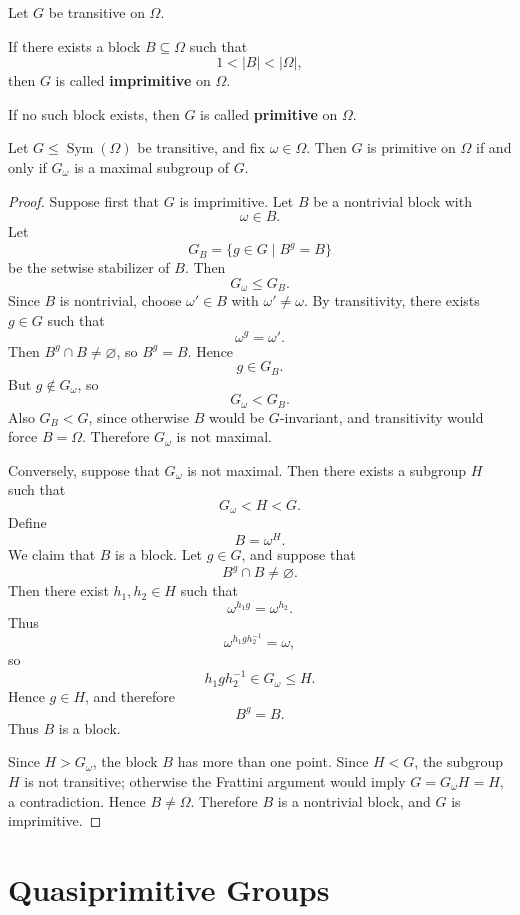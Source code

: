 \begin{definition}
Let \(G\) be transitive on \(\Omega\).

If there exists a block \(B\subseteq \Omega\) such that
\[
    1<|B|<|\Omega|,
\]
then \(G\) is called \textbf{imprimitive} on \(\Omega\).

If no such block exists, then \(G\) is called \textbf{primitive} on \(\Omega\).
\end{definition}

\begin{lemma}
Let \(G\leq \operatorname{Sym}(\Omega)\) be transitive, and fix
\(\omega\in\Omega\). Then \(G\) is primitive on \(\Omega\) if and only if
\(G_\omega\) is a maximal subgroup of \(G\).
\end{lemma}

\begin{proof}
Suppose first that \(G\) is imprimitive. Let \(B\) be a nontrivial block with
\[
    \omega\in B.
\]
Let
\[
    G_B=\{g\in G\mid B^g=B\}
\]
be the setwise stabilizer of \(B\). Then
\[
    G_\omega\leq G_B.
\]
Since \(B\) is nontrivial, choose \(\omega'\in B\) with \(\omega'\neq \omega\).
By transitivity, there exists \(g\in G\) such that
\[
    \omega^g=\omega'.
\]
Then \(B^g\cap B\neq\varnothing\), so \(B^g=B\). Hence
\[
    g\in G_B.
\]
But \(g\notin G_\omega\), so
\[
    G_\omega<G_B.
\]
Also \(G_B<G\), since otherwise \(B\) would be \(G\)-invariant, and transitivity
would force \(B=\Omega\). Therefore \(G_\omega\) is not maximal.

Conversely, suppose that \(G_\omega\) is not maximal. Then there exists a subgroup
\(H\) such that
\[
    G_\omega<H<G.
\]
Define
\[
    B=\omega^H.
\]
We claim that \(B\) is a block. Let \(g\in G\), and suppose that
\[
    B^g\cap B\neq\varnothing.
\]
Then there exist \(h_1,h_2\in H\) such that
\[
    \omega^{h_1g}=\omega^{h_2}.
\]
Thus
\[
    \omega^{h_1gh_2^{-1}}=\omega,
\]
so
\[
    h_1gh_2^{-1}\in G_\omega\leq H.
\]
Hence \(g\in H\), and therefore
\[
    B^g=B.
\]
Thus \(B\) is a block.

Since \(H>G_\omega\), the block \(B\) has more than one point. Since \(H<G\),
the subgroup \(H\) is not transitive; otherwise the Frattini argument would imply
\(G=G_\omega H=H\), a contradiction. Hence \(B\neq \Omega\). Therefore \(B\)
is a nontrivial block, and \(G\) is imprimitive.
\end{proof}

\section{Quasiprimitive Groups}

